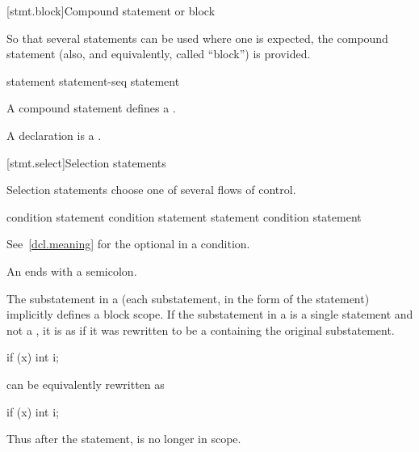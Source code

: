 [stmt.block]{Compound statement or block}%
%
%

\pnum
So that several statements can be used where one is expected, the
compound statement (also, and equivalently, called ``block'') is
provided.

\begin{bnf}
\br
    \terminal{\{}  \terminal{\}}
\end{bnf}

\begin{bnf}
\br
    statement\br
    statement-seq statement
\end{bnf}

A compound statement defines a .
\begin{note}
A declaration is a .
\end{note}

[stmt.select]{Selection statements}%

\pnum
Selection statements choose one of several flows of control.

%
%
%
\begin{bnf}
\br
      \terminal{(}  condition \terminal{)} statement\br
      \terminal{(}  condition \terminal{)} statement  statement\br
     \terminal{(}  condition \terminal{)} statement
\end{bnf}

See~\ref{dcl.meaning} for the optional  in a condition.
\begin{note}
An  ends with a semicolon.
\end{note}

\pnum
{}%
The substatement in a  (each substatement,
in the  form of the  statement) implicitly defines
a block scope. If the substatement in a
 is a single statement and not a
, it is as if it was rewritten to be a
 containing the original substatement.
\begin{example}
\begin{codeblock}
if (x)
  int i;
\end{codeblock}
can be equivalently rewritten as
\begin{codeblock}
if (x) {
  int i;
}
\end{codeblock}

Thus after the  statement,  is no longer in scope.
\end{example}

